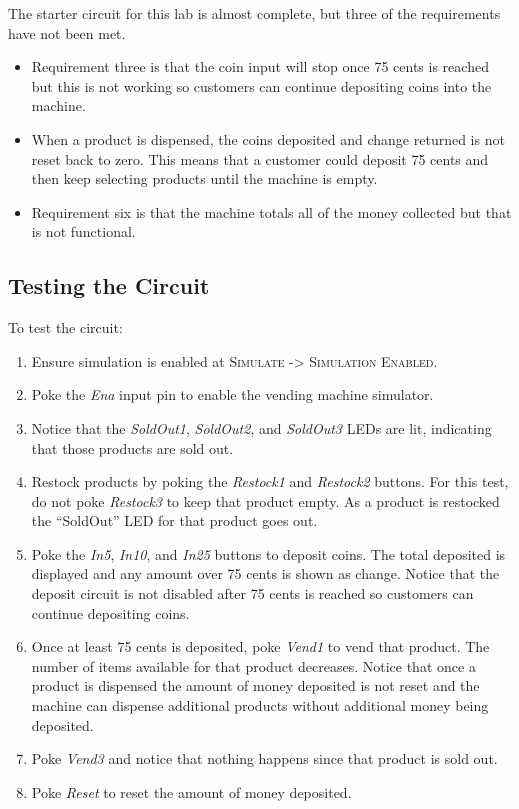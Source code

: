 The starter circuit for this lab is almost complete, but three of the requirements have not been met.

\begin{itemize}
	\item Requirement three is that the coin input will stop once 75 cents is reached but this is not working so customers can continue depositing coins into the machine.
	\item When a product is dispensed, the coins deposited and change returned is not reset back to zero. This means that a customer could deposit 75 cents and then keep selecting products until the machine is empty.
	\item Requirement six is that the machine totals all of the money collected but that is not functional.
\end{itemize}

\subsection{Testing the Circuit}

To test the circuit:

\begin{enumerate}
	\item Ensure simulation is enabled at \textsc{Simulate -> Simulation Enabled}.
	\item Poke the \textit{Ena} input pin to enable the vending machine simulator.
	\item Notice that the \textit{SoldOut1}, \textit{SoldOut2}, and \textit{SoldOut3} LEDs are lit, indicating that those products are sold out.
	\item Restock products by poking the \textit{Restock1} and \textit{Restock2} buttons. For this test, do not poke \textit{Restock3} to keep that product empty. As a product is restocked the ``SoldOut'' LED for that product goes out.
	\item Poke the \textit{In5}, \textit{In10}, and \textit{In25} buttons to deposit coins. The total deposited is displayed and any amount over 75 cents is shown as change. Notice that the deposit circuit is not disabled after 75 cents is reached so customers can continue depositing coins.
	\item Once at least 75 cents is deposited, poke \textit{Vend1} to vend that product. The number of items available for that product decreases. Notice that once a product is dispensed the amount of money deposited is not reset and the machine can dispense additional products without additional money being deposited.
	\item Poke \textit{Vend3} and notice that nothing happens since that product is sold out.
	\item Poke \textit{Reset} to reset the amount of money deposited.
\end{enumerate}

